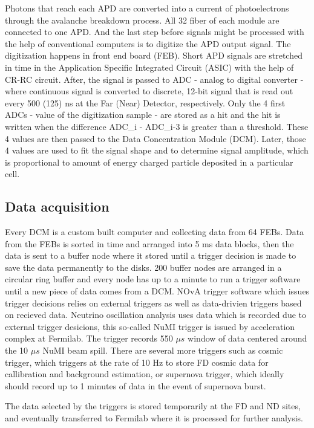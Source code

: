 Photons that reach each APD are converted into a current of photoelectrons through the avalanche breakdown 
process. All 32 fiber of each module are connected to one APD. And the last step before signals might be 
processed with the 
help of conventional computers is to digitize the APD output signal. The digitization happens in
front end board (FEB). Short APD signals are stretched in time in the Application Specific 
Integrated Circuit (ASIC) with the help of CR-RC circuit. After, the signal is passed to ADC - 
analog to digital converter - where continuous signal is converted to discrete, 12-bit signal
that is read out every 500 (125) ns at the Far (Near) Detector, respectively. Only the 4 first ADCs - 
value of the digitization sample - are stored as a hit and the hit is written when the difference
\be
ADC_i - ADC_{i-3}
\ee
is greater than a threshold. These 4 values are then passed to the Data Concentration Module (DCM). 
Later, those 4 values are used to fit the signal shape and to determine signal amplitude, which 
is proportional to amount of energy charged particle deposited in a particular cell.

\subsection{Data acquisition}
Every DCM is a custom built computer and collecting data from 64 FEBs. Data from the FEBs
is sorted in time and arranged into 5 ms data blocks, then the data is sent to a buffer node where it 
stored until a trigger decision is made to save the data permanently to the disks. 200 buffer nodes 
are arranged in a circular ring buffer and every node has up to a minute to run a trigger software 
until a new piece of data comes from a DCM. NOvA trigger software which issues trigger decisions relies
on external triggers as well as data-drivien triggers based on recieved data. Neutrino oscillation
analysis uses data which is recorded due to external trigger desicions, this so-called NuMI trigger 
is issued by acceleration complex at Fermilab. The trigger records 550 $\mu s$ window of data centered 
around the 10 $\mu s$ NuMI beam spill. There are several more triggers such as cosmic trigger, which 
triggers at the rate of 10 Hz to store FD cosmic data for callibration and background estimation, or 
supernova trigger, which ideally should record up to 1 minutes of data in the event of supernova burst.

The data selected by the triggers is stored temporarily at the FD and ND sites, and eventually transferred
to Fermilab where it is processed for further analysis.


